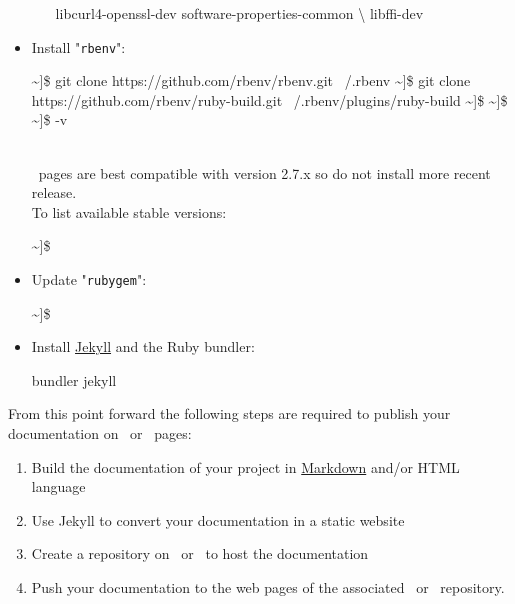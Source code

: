 \begin{itemize}
\begin{itemize}
{{\begin{scriptii}
                      libcurl4-openssl-dev software-properties-common \textbackslash
                      libffi-dev
\end{scriptii}
}}
\end{itemize}
\item Install "\texttt{rbenv}":
{\footnotesize{
\begin{scripti}
\textasciitilde]\$ git clone https://github.com/rbenv/rbenv.git ~/.rbenv
\textasciitilde]\$ git clone https://github.com/rbenv/ruby-build.git ~/.rbenv/plugins/ruby-build
\textasciitilde]\$   
\textasciitilde]\$   
\textasciitilde]\$  -v
\end{scripti}
}}
\\[-0.5cm]
\noindent \github\ pages are best compatible with version 2.7.x so do not install more recent release. \\
To list available stable versions:
{\footnotesize{
\begin{scripti}
\textasciitilde]\$   
\end{scripti}
}}
\item Update "\texttt{rubygem}":
{\footnotesize{
\begin{scripti}
\textasciitilde]\$   
\end{scripti}
}}
\item Install \href{https://jekyllrb.com}{Jekyll} and the Ruby bundler:
\vspace{-0.25cm}
\begin{scripti}
\fprompt{~}   bundler jekyll
\end{scripti}
\end{itemize}
From this point forward the following steps are required to publish your documentation on \github\ or \gitlab\ pages:
\begin{enumerate}
\item Build the documentation of your project in \href{https://www.markdownguide.org/}{Markdown} and/or HTML language
\item Use Jekyll to convert your documentation in a static website
\item Create a repository on \github\ or \gitlab\ to host the documentation
\item Push your documentation to the web pages of the associated \github\ or \gitlab\ repository. 
\end{enumerate}

